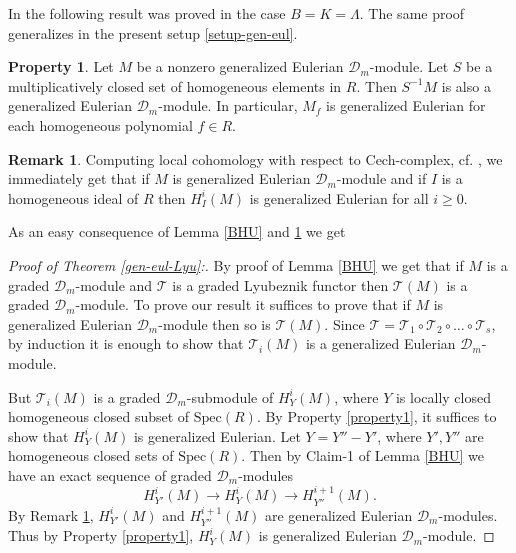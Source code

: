 \documentclass{amsart}
\newcommand{\D}{\mathcal{D} }
\newcommand{\FF}{\mathcal{T}}
\theoremstyle{plain}
\theoremstyle{definition}
\newtheorem{remark}[theorem]{Remark}
\newtheorem{property}[theorem]{Property}
\theoremstyle{remark}
\begin{document}
In \cite{PS} the following result was proved in the case $B = K = \Lambda$. The same proof generalizes in the present setup \ref{setup-gen-eul}.
\begin{property}\label{property4}
Let $M$ be a nonzero generalized Eulerian $\D_m$-module.
Let $S$ be a multiplicatively closed set of homogeneous elements in $R$.
Then $S^{-1}M$ is also a generalized Eulerian $\D_m$-module. 
 In particular, $M_f$ is generalized Eulerian for each homogeneous polynomial $f \in R$.
\end{property}
\begin{remark}\label{hom-gen-eul}
Computing local cohomology with respect to Cech-complex, cf. \cite[5.1.19]{BS}, we immediately get that if $M$ is generalized Eulerian $\D_m$-module 
and if $I$ is a homogeneous ideal of $R$ then $H^i_I(M)$ is generalized Eulerian for all $i \geq 0$.
\end{remark}


As an easy consequence of Lemma \ref{BHU} and \ref{property4} we get
\begin{proof}[ Proof of Theorem \ref{gen-eul-Lyu}:]   
 By proof of Lemma \ref{BHU} we get that if $M$ is a graded $\D_m$-module and $\FF$ is a graded Lyubeznik functor then 
 $\FF(M)$ is a graded $\D_m$-module. To prove our result it suffices to prove that if $M$ is generalized Eulerian
 $\D_m$-module then so is $\FF(M)$. Since $\mathcal{T}= \mathcal{T}_1\circ \mathcal{T}_2 \circ \ldots \circ \mathcal{T}_s$, 
by induction it is enough to show that $\mathcal{T}_i(M)$ is a generalized Eulerian $\D_m$-module.

But $\mathcal{T}_i(M)$ is a graded $\D_m$-submodule of $H_Y^i(M)$, where $Y$ is locally closed homogeneous
closed subset of $\text{Spec}(R)$. 
By Property \ref{property1}, it  suffices to show that $H_Y^i(M)$ is generalized Eulerian. 
Let $Y= Y''-Y'$, where $Y', Y''$ are homogeneous closed sets of $\text{Spec}(R)$. 
Then by Claim-1 of Lemma \ref{BHU} we have an exact sequence of graded $\D_m$-modules
\begin{equation*} 
H_{Y'}^i(M) \longrightarrow H_{Y}^i(M) \longrightarrow H_{Y''}^{i+1}(M). 
\end{equation*}
By Remark \ref{hom-gen-eul}, $H_{Y'}^i(M)$ and $H_{Y''}^{i+1}(M)$ are generalized Eulerian $\D_m$-modules.
Thus by Property \ref{property1}, $H_Y^i(M)$ is generalized Eulerian $\D_m$-module.
 \end{proof}
\end{document}
